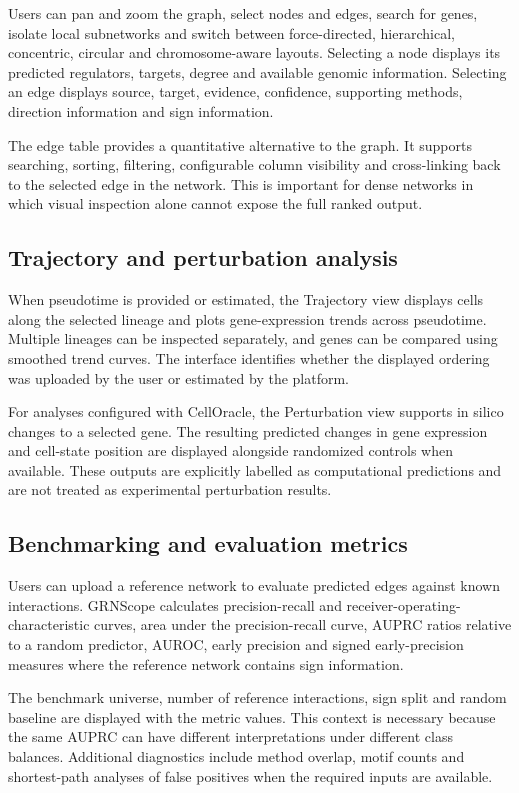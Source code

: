 \documentclass[unnumsec,webpdf,modern,large]{oup-authoring-template}%
\begin{document}
Users can pan and zoom the graph, select nodes and edges, search for genes, isolate local subnetworks and switch between force-directed, hierarchical, concentric, circular and chromosome-aware layouts. Selecting a node displays its predicted regulators, targets, degree and available genomic information. Selecting an edge displays source, target, evidence, confidence, supporting methods, direction information and sign information.

The edge table provides a quantitative alternative to the graph. It supports searching, sorting, filtering, configurable column visibility and cross-linking back to the selected edge in the network. This is important for dense networks in which visual inspection alone cannot expose the full ranked output.

\subsection{Trajectory and perturbation analysis}

When pseudotime is provided or estimated, the Trajectory view displays cells along the selected lineage and plots gene-expression trends across pseudotime. Multiple lineages can be inspected separately, and genes can be compared using smoothed trend curves. The interface identifies whether the displayed ordering was uploaded by the user or estimated by the platform.

For analyses configured with CellOracle, the Perturbation view supports in silico changes to a selected gene. The resulting predicted changes in gene expression and cell-state position are displayed alongside randomized controls when available. These outputs are explicitly labelled as computational predictions and are not treated as experimental perturbation results.

\subsection{Benchmarking and evaluation metrics}

Users can upload a reference network to evaluate predicted edges against known interactions. GRNScope calculates precision-recall and receiver-operating-characteristic curves, area under the precision-recall curve, AUPRC ratios relative to a random predictor, AUROC, early precision and signed early-precision measures where the reference network contains sign information.

The benchmark universe, number of reference interactions, sign split and random baseline are displayed with the metric values. This context is necessary because the same AUPRC can have different interpretations under different class balances. Additional diagnostics include method overlap, motif counts and shortest-path analyses of false positives when the required inputs are available.
\end{document}
